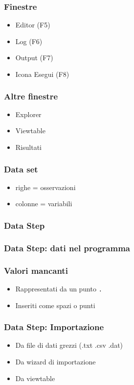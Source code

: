 \begin{frame}\frametitle{Finestre}
  \begin{itemize}
  \item
    Editor (F5)
  \item
    Log (F6)
  \item
    Output (F7)
  \item
    Icona Esegui (F8)
  \end{itemize}
\end{frame}

\begin{frame}\frametitle{Altre finestre}
  \begin{itemize}
  \item
    Explorer
  \item
    Viewtable
  \item
    Risultati
  \end{itemize}
\end{frame}

\begin{frame}\frametitle{Data set}
  \begin{itemize}
  \item
    righe = osservazioni
  \item
    colonne = variabili
  \end{itemize}
\end{frame}

\begin{frame}[fragile]\frametitle{Data Step}
\end{frame}

\begin{frame}\frametitle{Data Step: dati nel programma}
\end{frame}


\begin{frame}\frametitle{Valori mancanti}
  \begin{itemize}
  \item
    Rappresentati da un punto \texttt{.}
  \item
    Inseriti come spazi o punti
  \end{itemize}\end{frame}

\begin{frame}\frametitle{Data Step: Importazione}
  \begin{itemize}
  \item
    Da file di dati grezzi (.txt .csv .dat)
  \item
    Da wizard di importazione
  \item
    Da viewtable
  \end{itemize}
\end{frame}

